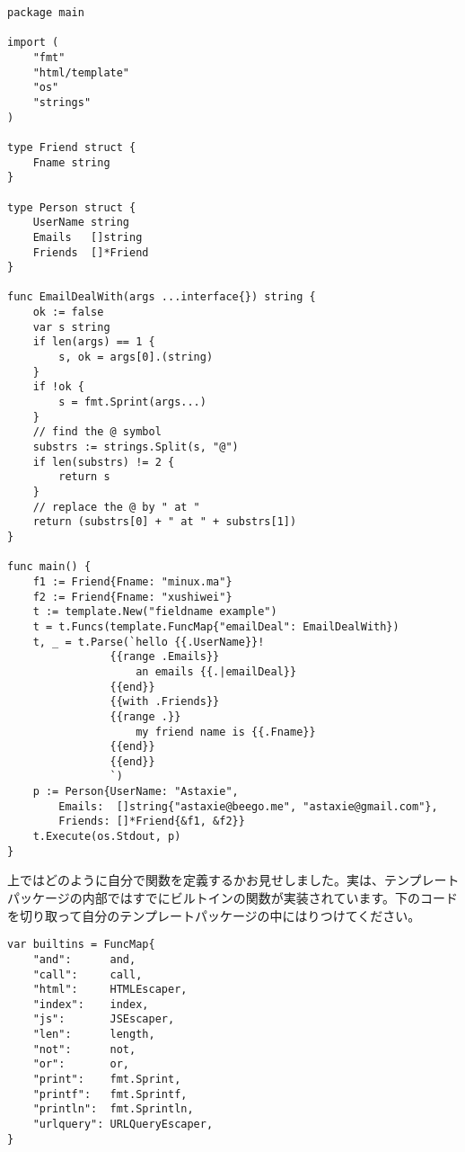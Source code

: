 \begin{lstlisting}[numbers=none]
package main

import (
    "fmt"
    "html/template"
    "os"
    "strings"
)

type Friend struct {
    Fname string
}

type Person struct {
    UserName string
    Emails   []string
    Friends  []*Friend
}

func EmailDealWith(args ...interface{}) string {
    ok := false
    var s string
    if len(args) == 1 {
        s, ok = args[0].(string)
    }
    if !ok {
        s = fmt.Sprint(args...)
    }
    // find the @ symbol
    substrs := strings.Split(s, "@")
    if len(substrs) != 2 {
        return s
    }
    // replace the @ by " at "
    return (substrs[0] + " at " + substrs[1])
}

func main() {
    f1 := Friend{Fname: "minux.ma"}
    f2 := Friend{Fname: "xushiwei"}
    t := template.New("fieldname example")
    t = t.Funcs(template.FuncMap{"emailDeal": EmailDealWith})
    t, _ = t.Parse(`hello {{.UserName}}!
                {{range .Emails}}
                    an emails {{.|emailDeal}}
                {{end}}
                {{with .Friends}}
                {{range .}}
                    my friend name is {{.Fname}}
                {{end}}
                {{end}}
                `)
    p := Person{UserName: "Astaxie",
        Emails:  []string{"astaxie@beego.me", "astaxie@gmail.com"},
        Friends: []*Friend{&f1, &f2}}
    t.Execute(os.Stdout, p)
}
\end{lstlisting}

上ではどのように自分で関数を定義するかお見せしました。実は、テンプレートパッケージの内部ではすでにビルトインの関数が実装されています。下のコードを切り取って自分のテンプレートパッケージの中にはりつけてください。

\begin{lstlisting}[numbers=none]
var builtins = FuncMap{
    "and":      and,
    "call":     call,
    "html":     HTMLEscaper,
    "index":    index,
    "js":       JSEscaper,
    "len":      length,
    "not":      not,
    "or":       or,
    "print":    fmt.Sprint,
    "printf":   fmt.Sprintf,
    "println":  fmt.Sprintln,
    "urlquery": URLQueryEscaper,
}
\end{lstlisting}

